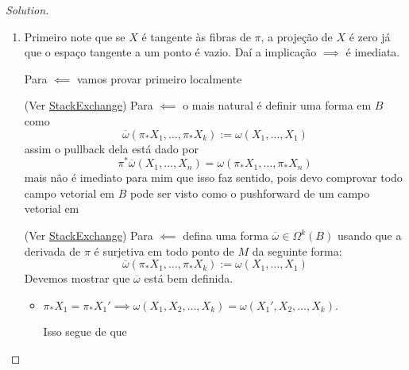 \begin{proof}[Solution]\leavevmode
\begin{enumerate}[label=\alph*.]
	\item Primeiro note que se $X$ é tangente às fibras de $\pi$, a projeção de $X$ é zero já que o espaço tangente a um ponto é vazio. Daí a implicação $\implies $ é imediata.

	Para $\impliedby$ vamos provar primeiro localmente

	(Ver \href{https://math.stackexchange.com/questions/69658/basic-differential-forms}{StackExchange}) Para $\impliedby$ o mais natural é definir uma forma em $B$ como
	\[\overline{\omega}(\pi_*X_1,\ldots,\pi_*X_k):=\omega(X_1,\ldots,X_1)\]
assim o pullback dela está dado por
\[\pi^*\overline{\omega}(X_1,\ldots,X_n)=\omega(\pi_*X_1,\ldots,\pi_*X_n)\]
mais não é imediato para mim que isso faz sentido, pois devo comprovar todo campo vetorial em $B$ pode ser visto como o pushforward de um campo vetorial em 



\clearpage
	(Ver \href{https://math.stackexchange.com/questions/69658/basic-differential-forms}{StackExchange}) Para  $\impliedby$ defina uma forma $\overline{\omega}\in\Omega^{k}(B)$ usando que a derivada de $\pi$ é surjetiva em todo ponto de $M$ da seguinte forma:
	\[\overline{\omega}(\pi_*X_1,\ldots,\pi_*X_k):=\omega(X_1,\ldots,X_1)\]
Devemos mostrar que $\overline{\omega}$ está bem definida.

\begin{itemize}
\item {\color{persimmon}$\pi_*X_1=\pi_*X_1'\implies \omega(X_1,X_2,\ldots,X_k)=\omega(X_1',X_2,\ldots,X_k)$.}

	Isso segue de que 
\end{itemize}

\end{enumerate}	
\end{proof}


